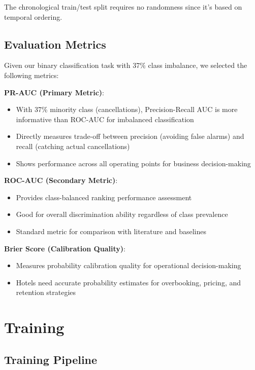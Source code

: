 \documentclass[
  letterpaper,
  DIV=11,
  numbers=noendperiod]{scrartcl}
\providecommand{\tightlist}{%
  \setlength{\itemsep}{0pt}\setlength{\parskip}{0pt}}
\begin{document}
The chronological train/test split requires no randomness since it's
based on temporal ordering.

\subsection{Evaluation Metrics}\label{evaluation-metrics}

Given our binary classification task with 37\% class imbalance, we
selected the following metrics:

\textbf{PR-AUC (Primary Metric)}:

\begin{itemize}
\tightlist
\item
  With 37\% minority class (cancellations), Precision-Recall AUC is more
  informative than ROC-AUC for imbalanced classification
\item
  Directly measures trade-off between precision (avoiding false alarms)
  and recall (catching actual cancellations)
\item
  Shows performance across all operating points for business
  decision-making
\end{itemize}

\textbf{ROC-AUC (Secondary Metric)}:

\begin{itemize}
\tightlist
\item
  Provides class-balanced ranking performance assessment
\item
  Good for overall discrimination ability regardless of class prevalence
\item
  Standard metric for comparison with literature and baselines
\end{itemize}

\textbf{Brier Score (Calibration Quality)}:

\begin{itemize}
\tightlist
\item
  Measures probability calibration quality for operational
  decision-making
\item
  Hotels need accurate probability estimates for overbooking, pricing,
  and retention strategies
\end{itemize}

\section{Training}\label{training}

\subsection{Training Pipeline}\label{training-pipeline}
\end{document}
